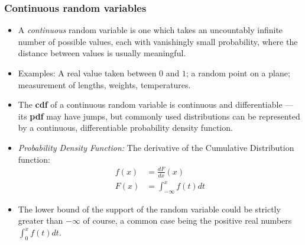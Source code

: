 \begin{frame}
\frametitle{Continuous random variables}
\begin{itemize}
\item A \emph{continuous} random variable is one which takes an uncountably infinite number of possible values, each with vanishingly small probability, where the distance between values is usually meaningful.
\item Examples: A real value taken between $0$ and $1$; a random point on a plane; measurement of lengths, weights, temperatures.
\item The \textbf{cdf} of a continuous random variable is continuous and differentiable --- its \textbf{pdf} may have jumps, but commonly used distributions can be represented by a continuous, differentiable probability density function. 
\item \emph{Probability Density Function:} The derivative of the Cumulative Distribution function:
\begin{align*}
f(x) & = \frac{dF}{dx}(x) \\
F(x) & = \int_{-\infty}^x f(t) dt
\end{align*}
\item The lower bound of the support of the random variable could be strictly greater than $-\infty$ of course, a common case being the positive real numbers $\int_{0}^x f(t) dt$.
\end{itemize}
\end{frame}


